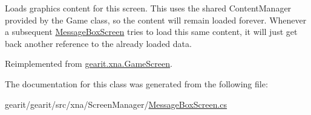 Loads graphics content for this screen. This uses the shared Content\+Manager provided by the Game class, so the content will remain loaded forever. Whenever a subsequent \hyperlink{classgearit_1_1xna_1_1_message_box_screen}{Message\+Box\+Screen} tries to load this same content, it will just get back another reference to the already loaded data. 



Reimplemented from \hyperlink{classgearit_1_1xna_1_1_game_screen_a7b4299ca1406c8d4ffcd2e479e83bef5}{gearit.\+xna.\+Game\+Screen}.



The documentation for this class was generated from the following file\+:\begin{DoxyCompactItemize}
\item 
gearit/gearit/src/xna/\+Screen\+Manager/\hyperlink{_message_box_screen_8cs}{Message\+Box\+Screen.\+cs}\end{DoxyCompactItemize}
